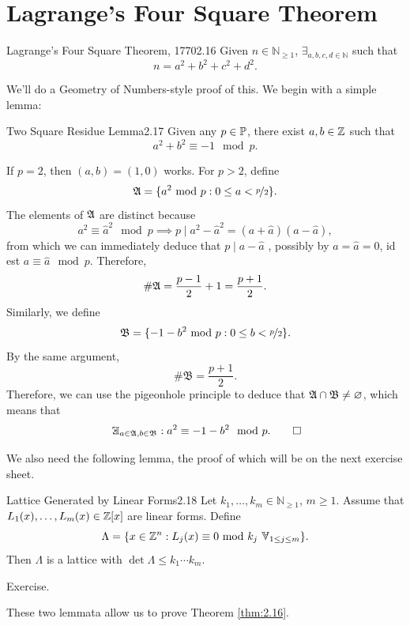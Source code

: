 \documentclass{Vorlesungstemplate_English} %
\newcommand{\Nzero}{\mathbb{N}}
\renewcommand{\N}{\mathbb{N}_{\geq 1}}
\begin{document}
\section{Lagrange's Four Square Theorem}
\begin{theorem}{Lagrange's Four Square Theorem, 1770}{2.16}
  Given $n \in \N$, $\exists_{a,b,c,d \in \Nzero}$ such that
  \[ n = a^2+b^2+c^2+d^2.\]
\end{theorem}
\noindent We'll do a Geometry of Numbers-style proof of this. We begin with a simple lemma:
\begin{lemma}{Two Square Residue Lemma}{2.17}
  Given any $p \in \mathbb{P}$, there exist $a,b \in \mathbb{Z}$ such that
  \[ a^2+b^2 \equiv -1 \mod p.\]
\end{lemma}
\begin{pf}
  If $p=2$, then $(a,b)=(1,0)$ works. For $p > 2$, define
  \[ \mathfrak{A} = \{ a^2 \text{ mod } p: 0 \leq a < \nicefrac{p}{2}\}.\]
  The elements of $\mathfrak{A}$ are distinct because
  \[ a^2 \equiv \widehat{a}^2 \mod p \implies p \mid a^2-\widehat{a}^2 = (a+\widehat{a})(a-\widehat{a}),\]
  from which we can immediately deduce that $p \mid a-\widehat{a}$ {\color{blue}, possibly by $a = \widehat{a} = 0$}, id est $a \equiv \widehat{a} \mod p$. Therefore,
  \[ \#\mathfrak{A} = \frac{p-1}{2}+1 = \frac{p+1}{2}.\]
  Similarly, we define
  \[ \mathfrak{B} = \{ -1-b^2 \text{ mod } p: 0 \leq b < \nicefrac{p}{2}\}.\]
  By the same argument,
  \[ \#\mathfrak B = \frac{p+1}{2}.\]
  Therefore, we can use the pigeonhole principle to deduce that $\mathfrak{A} \cap \mathfrak B \neq \varnothing$, which means that
  \[ \exists_{a \in \A, b \in \mathfrak B}: a^2 \equiv -1-b^2 \mod p. \qedhere\]
\end{pf}
\noindent We also need the following lemma, the proof of which will be on the next exercise sheet.
\begin{lemma}{Lattice Generated by Linear Forms}{2.18}
  Let $k_1, \dots, k_m \in \N$, $m \geq 1$. Assume that $L_1(x), \dots, L_m(x) \in \mathbb{Z}[x]$ are linear forms. Define
  \[ \Lambda = \{ x \in \Z^n: L_j(x) \equiv 0 \smod k_j \forall_{1 \leq j \leq m}\}.\]
  Then $\Lambda$ is a lattice with $\det\Lambda \leq k_1\cdots k_m$.
\end{lemma}
\begin{pf}
  Exercise.
\end{pf}
\noindent These two lemmata allow us to prove Theorem \ref{thm:2.16}.
\end{document}
